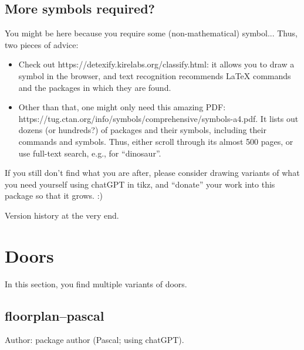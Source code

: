 \documentclass{article}
\begin{document}
\subsection*{More symbols required?}

You might be here because you require some (non-mathematical) symbol... Thus, two pieces of advice:

\begin{itemize}
  \item Check out https://detexify.kirelabs.org/classify.html: it allows you to draw a symbol in the browser, and text recognition recommends \LaTeX{} commands and the packages in which they are found.
  \item Other than that, one might only need this amazing PDF:\\
  https://tug.ctan.org/info/symbols/comprehensive/symbols-a4.pdf. 
  It lists out dozens (or hundreds?) of packages and their symbols, including their commands and symbols. Thus, either scroll through its almost 500 pages, or use full-text search, e.g., for ``dinosaur''.  
\end{itemize}

If you still don't find what you are after, please consider drawing variants of what you need yourself using chatGPT in tikz, and ``donate'' your work into this package so that it grows. :)

Version history at the very end.

\pagebreak

\section{Doors}

In this section, you find multiple variants of doors.


\subsection{floorplan--pascal}

Author: package author (Pascal; using chatGPT).
\end{document}

